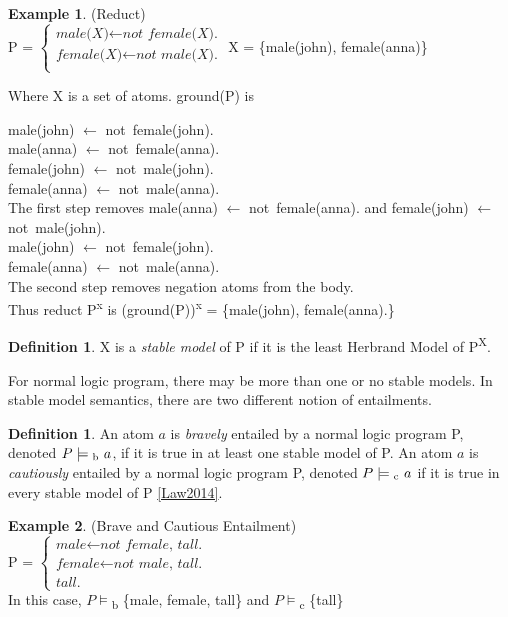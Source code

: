 \documentclass[11pt,twoside]{report}
\theoremstyle{plain}
\theoremstyle{definition}
\newtheorem{defn}[thm]{Definition} %
\newtheorem{examp}{Example}[section]
\begin{document}
\begin{examp} \normalfont (Reduct) \\

P = $\begin{cases}
	\textit{male(X)}  \leftarrow \textit{not female(X).} \\
  	\textit{female(X)} \leftarrow \textit{not male(X).} \\
      \end{cases}$  X = \{male(john), female(anna)\}

Where X is a set of atoms. ground(P) is

male(john)  $\leftarrow$ not\ female(john). \\
male(anna)  $\leftarrow$ not\ female(anna). \\
female(john) $\leftarrow$ not\ male(john). \\
female(anna) $\leftarrow$ not\ male(anna). \\

The first step removes male(anna)  $\leftarrow$ not\ female(anna). and female(john) $\leftarrow$ not\ male(john).\\

male(john)  $\leftarrow$ not\ female(john). \\
female(anna) $\leftarrow$ not\ male(anna). \\

The second step removes negation atoms from the body. \\
Thus reduct P\textsuperscript{x} is (ground(P))\textsuperscript{x} =  \{male(john), female(anna).\}
\label{reduct}
\end{examp}

\begin{defn}
X is a \textit{stable model} of P if it is the least Herbrand Model of P\textsuperscript{X}.
\end{defn}

For normal logic program, there may be more than one or no stable models. In stable model semantics,  there are two different notion of entailments.
\begin{defn}
An atom $a$ is \textit{bravely} entailed by a normal logic program P, denoted $ P \models\textsubscript{b} \ a$, if it is true in at least one stable model of P. An atom $a$ is \textit{cautiously} entailed by a normal logic program P, denoted $ P \models\textsubscript{c} \ a$ if it is true in every stable model of P \ref{Law2014}.
\end{defn}

\begin{examp} \normalfont (Brave and Cautious Entailment) \\

P = $\begin{cases}
	\textit{male}  \leftarrow \textit{not female, tall.} \\
  	\textit{female} \leftarrow \textit{not male, tall.} \\
	\textit{tall.}
      \end{cases}$ \\

In this case, $P\models$\textsubscript{b} \{male, female, tall\} and $P\models$\textsubscript{c} \{tall\}
\end{examp}
\end{document}
